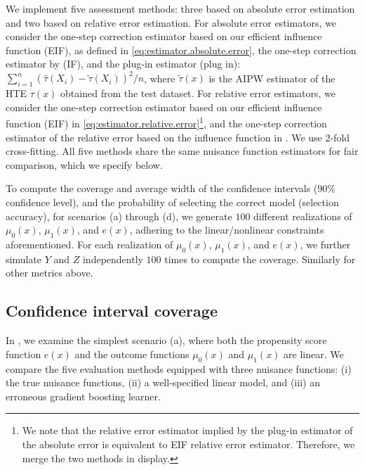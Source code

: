\documentclass[twoside]{article}
\newcommand{\1}{{\mathbbm{1}}}
\begin{document}
We implement five assessment methods: three based on absolute error estimation and two based on relative error estimation.
For absolute error estimators, we consider
the one-step correction estimator based on our efficient influence function (EIF), as defined in \eqref{eq:estimator.absolute.error}, the one-step correction estimator by \cite{alaa2019validating} (IF), and the plug-in estimator (plug in): $\sum_{i=1}^n (\hat{\tau}(X_i) - \tilde{\tau}(X_i))^2 / n$, where $\tilde{\tau}(x)$ is the AIPW estimator of the HTE $\tau(x)$ obtained from the test dataset.
For relative error estimators, we consider the one-step correction estimator based on our efficient influence function (EIF) in \eqref{eq:estimator.relative.error}\footnote{We note that the relative error estimator implied by the plug-in estimator of the absolute error is equivalent to EIF relative error estimator.
Therefore, we merge the two methods in display.}, and the one-step correction estimator of the relative error based on the influence function in \cite{alaa2019validating}.
We use 2-fold cross-fitting.
All five methods share the same nuisance function estimators for fair comparison, which we specify below.


To compute the coverage and average width of the confidence intervals ($90\%$ confidence level), and the probability of selecting the correct model (selection accuracy), for scenarios (a) through (d), we generate $100$ different realizations of $\mu_0(x)$, $\mu_1(x)$, and $e(x)$, adhering to the linear/nonlinear constraints aforementioned. For each realization of $\mu_0(x)$, $\mu_1(x)$, and $e(x)$, we further simulate $Y$ and $Z$ independently $100$ times to compute the coverage. 
Similarly for other metrics above.


\subsection{Confidence interval coverage}\label{sec:coverage}

In , we examine the simplest scenario (a), where both the propensity score function $e(x)$ and the outcome functions $\mu_0(x)$ and $\mu_1(x)$ are linear. We compare the five evaluation methods equipped with three nuisance functions: (i) the true nuisance functions, (ii) a well-specified linear model, and (iii) an erroneous gradient boosting learner.
\end{document}
